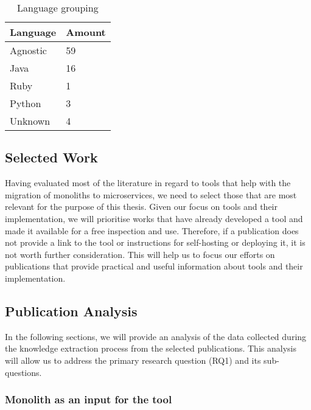 \begin{table}[!htb] \caption{Language grouping} \label{tab:language-grouping}
  \begin{center}
    \begin{tabular}[c]{p{12em}|p{4em}}
      \textbf{Language} &
      \textbf{Amount} \\
      \hline Agnostic & {59} \\
      \hline Java & {16} \\
      \hline Ruby & {1} \\
      \hline Python & {3} \\
      \hline Unknown & {4} \\
    \end{tabular}
  \end{center}
\end{table}

\subsection{Selected Work}

Having evaluated most of the literature in regard to tools that help with the
migration of monoliths to microservices, we need to select those that are most
relevant for the purpose of this thesis. Given our focus on tools and their
implementation, we will prioritise works that have already developed a tool and
made it available for a free inspection and use. Therefore, if a publication
does not provide a link to the tool or instructions for self-hosting or
deploying it, it is not worth further consideration. This will help us to focus
our efforts on publications that provide practical and useful information about
tools and their implementation.

\subsection{Publication Analysis} \label{sub:publication-analysis}

In the following sections, we will provide an analysis of the data collected
during the knowledge extraction process from the selected publications. This
analysis will allow us to address the primary research question (RQ1) and its
sub-questions.

\subsubsection{Monolith as an input for the tool}

